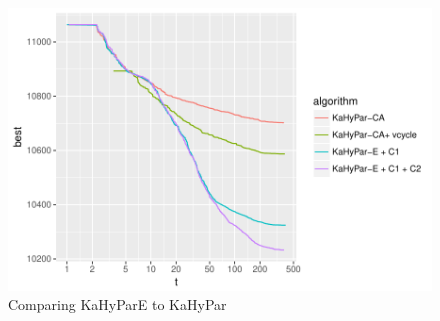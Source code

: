 \documentclass[a4paper,12pt,bibtotoc,titlepage, liststotoc,BCOR7mm,headsepline,pointlessnumbers]{scrbook}
\numberwithin{equation}{section}
\begin{document}
\begin{figure}[H]
\caption{Comparing KaHyParE to KaHyPar}
\begin{center}
\includegraphics{bachelorarbeit-basiccomparation}
\end{center}

\end{figure}
\end{document}
